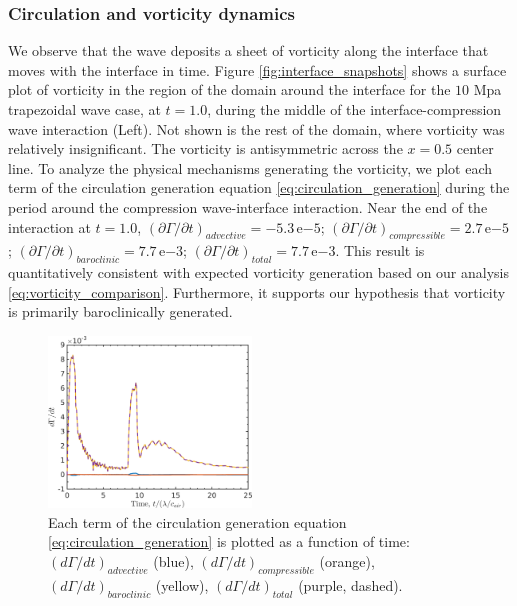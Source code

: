 \subsubsection{Circulation and vorticity dynamics}
We observe that the wave deposits a sheet of vorticity along the
interface that moves with the interface in time. Figure
\ref{fig:interface_snapshots} shows a surface plot of vorticity in the
region of the domain around the interface for the $10$ Mpa trapezoidal
wave case, at $t=1.0$, during the middle of the interface-compression
wave interaction (Left). Not shown is the rest of the domain, where
vorticity was relatively insignificant. The vorticity is antisymmetric
across the $x=0.5$ center line. To analyze the physical mechanisms
generating the vorticity, we plot each term of the circulation
generation equation \eqref{eq:circulation_generation} during the
period around the compression wave-interface interaction. Near the end
of the interaction at $t=1.0$,
$\left(\partial \Gamma/\partial t\right)_{advective} =
-5.3\,\text{e}{-5}$; %
$\left(\partial \Gamma/\partial t\right)_{compressible} =
2.7\,\text{e}{-5}$; %
$\left(\partial \Gamma/\partial t\right)_{baroclinic} =
7.7\,\text{e}{-3}$; %
$\left(\partial \Gamma/\partial t\right)_{total} =
7.7\,\text{e}{-3}$. %
This result is quantitatively consistent with expected vorticity generation
based on our analysis \eqref{eq:vorticity_comparison}. Furthermore, it
supports our hypothesis that vorticity is primarily baroclinically
generated. 
%
\begin{figure}[h] 
  \centering
  \includegraphics[width=0.48\textwidth]{./figs/lung_figs/ddtcirc_fixed}
  \caption[The individual contributions to circulation generation by physical mechanism]{Each term of the
    circulation generation equation \eqref{eq:circulation_generation} is plotted as a function of time:
    $\left(d\Gamma/dt\right)_{advective}$ (blue),
    $\left(d\Gamma/dt\right)_{compressible}$ (orange),
    $\left(d\Gamma/dt\right)_{baroclinic}$ (yellow),
    $\left(d\Gamma/dt\right)_{total}$ (purple, dashed).}
  \label{fig:trapz_ddt_circ}
\end{figure}
%
